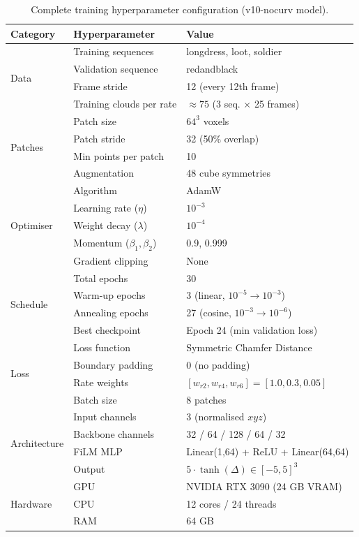 \begin{table}[h]
  \centering
  \caption{Complete training hyperparameter configuration (v10-nocurv model).}
  \label{tab:hyperparams}
  \small
  \begin{tabular}{lll}
    \toprule
    \textbf{Category} & \textbf{Hyperparameter} & \textbf{Value} \\
    \midrule
    \multirow{4}{*}{Data} &
      Training sequences & longdress, loot, soldier \\
    & Validation sequence & redandblack \\
    & Frame stride & 12 (every 12th frame) \\
    & Training clouds per rate & $\approx 75$ (3 seq. $\times$ 25 frames) \\
    \midrule
    \multirow{4}{*}{Patches} &
      Patch size & $64^3$ voxels \\
    & Patch stride & 32 (50\% overlap) \\
    & Min points per patch & 10 \\
    & Augmentation & 48 cube symmetries \\
    \midrule
    \multirow{5}{*}{Optimiser} &
      Algorithm & AdamW \\
    & Learning rate ($\eta$) & $10^{-3}$ \\
    & Weight decay ($\lambda$) & $10^{-4}$ \\
    & Momentum ($\beta_1, \beta_2$) & 0.9, 0.999 \\
    & Gradient clipping & None \\
    \midrule
    \multirow{4}{*}{Schedule} &
      Total epochs & 30 \\
    & Warm-up epochs & 3 (linear, $10^{-5} \to 10^{-3}$) \\
    & Annealing epochs & 27 (cosine, $10^{-3} \to 10^{-6}$) \\
    & Best checkpoint & Epoch 24 (min validation loss) \\
    \midrule
    \multirow{4}{*}{Loss} &
      Loss function & Symmetric Chamfer Distance \\
    & Boundary padding & 0 (no padding) \\
    & Rate weights & $[w_{r2}, w_{r4}, w_{r6}] = [1.0, 0.3, 0.05]$ \\
    & Batch size & 8 patches \\
    \midrule
    \multirow{4}{*}{Architecture} &
      Input channels & 3 (normalised $xyz$) \\
    & Backbone channels & 32 / 64 / 128 / 64 / 32 \\
    & FiLM MLP & Linear(1,64) + ReLU + Linear(64,64) \\
    & Output & $5 \cdot \tanh(\Delta) \in [-5,5]^3$ \\
    \midrule
    \multirow{3}{*}{Hardware} &
      GPU & NVIDIA RTX 3090 (24 GB VRAM) \\
    & CPU & 12 cores / 24 threads \\
    & RAM & 64 GB \\
    \bottomrule
  \end{tabular}
\end{table}

